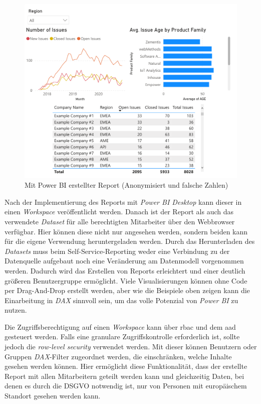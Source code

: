 \begin{figure}[htbp]
 \centering
 \includegraphics[width=\textwidth]{gfx/pbi_report.pdf}
 \caption[Power BI Report]{Mit Power BI erstellter Report (Anonymisiert und falsche Zahlen)}
\label{fig:praktischeUmsetzung:pbiRep}
\end{figure}

Nach der Implementierung des Reports mit \textit{Power BI Desktop} kann dieser in einen \textit{Workspace} veröffentlicht werden. Danach ist der Report als auch das verwendete \textit{Dataset} für alle berechtigten Mitarbeiter über den Webbrowser verfügbar. Hier können diese nicht nur angesehen werden, sondern beiden kann für die eigene Verwendung heruntergeladen werden. Durch das Herunterladen des \textit{Datasets} muss beim Self-Service-Reporting weder eine Verbindung zu der Datenquelle aufgebaut noch eine Veränderung am Datenmodell vorgenommen werden. Dadurch wird das Erstellen von Reports erleichtert und einer deutlich größeren Benutzergruppe ermöglicht. Viele Visualisierungen können ohne Code per Drag-And-Drop erstellt werden, aber wie die Beispiele oben zeigen kann die Einarbeitung in \textit{DAX} sinnvoll sein, um das volle Potenzial von \textit{Power BI} zu nutzen.

Die Zugriffsberechtigung auf einen \textit{Workspace} kann über \ac{rbac} und dem \ac{aad} gesteuert werden. Falls eine granulare Zugriffskontrolle erforderlich ist, sollte jedoch die \textit{row-level security} verwendet werden. Mit dieser können Benutzern oder Gruppen \textit{DAX}-Filter zugeordnet werden, die einschränken, welche Inhalte gesehen werden können. Hier ermöglicht diese Funktionalität, dass der erstellte Report mit allen Mitarbeitern geteilt werden kann und gleichzeitig Daten, bei denen es durch die DSGVO notwendig ist, nur von Personen mit europäischem Standort gesehen werden kann.

